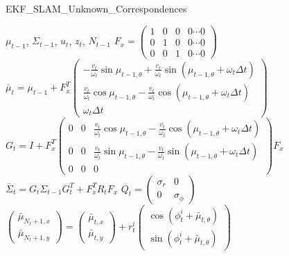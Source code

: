 \documentclass[conference]{IEEEtran}
\begin{document}
\begin{algorithm}[htbp]
	\caption{EKF\_SLAM\_Unknown\_Correspondences}
	\label{alg:EKF_SLAM_Unknown_Correspondences}
	\scriptsize
	\begin{algorithmic}[1]
		\Require $\mu_{t-1}$, $\Sigma_{t-1}$, $u_{t}$, $z_{t}$, $N_{t-1}$
		\State $F_{x} = \begin{pmatrix} 1 & 0 & 0 & 0 \cdots 0 \\ 0 & 1 & 0 & 0 \cdots 0 \\ 0 & 0 & 1 & 0 \cdots 0 \end{pmatrix}$
		\State $\bar{\mu}_{t} = \mu_{t-1} + F_{x}^{T} \begin{pmatrix} -\frac{v_{t}}{\omega_{t}}\sin{\mu_{t-1,\theta}} + \frac{v_{t}}{\omega_{t}}\sin(\mu_{t-1,\theta}+\omega_{t}\Delta{t}) \\ \frac{v_{t}}{\omega_{t}}\cos{\mu_{t-1,\theta}} - \frac{v_{t}}{\omega_{t}}\cos(\mu_{t-1,\theta}+\omega_{t}\Delta{t}) \\ \omega_{t}\Delta{t} \end{pmatrix}$
		\State $G_{t} = I + F_{x}^{T} \begin{pmatrix} 0 & 0 & \frac{v_{t}}{\omega_{t}}\cos{\mu_{t-1,\theta}} - \frac{v_{t}}{\omega_{t}}\cos(\mu_{t-1,\theta}+\omega_{t}\Delta{t}) \\ 0 & 0 & \frac{v_{t}}{\omega_{t}}\sin{\mu_{t-1,\theta}} - \frac{v_{t}}{\omega_{t}}\sin(\mu_{t-1,\theta}+\omega_{t}\Delta{t}) \\ 0 & 0 & 0 \end{pmatrix} F_{x}$
		\State $\bar{\Sigma}_{t} = G_{t}\Sigma_{t-1}G_{t}^{T} + F_{x}^{T}R_{t}F_{x}$
		\State $Q_{t} = \begin{pmatrix} \sigma_{r} & 0 \\ 0 & \sigma_{\phi} \end{pmatrix}$
			\State $\begin{pmatrix} \bar{\mu}_{N_{t}+1,x} \\ \bar{\mu}_{N_{t}+1,y} \end{pmatrix} = \begin{pmatrix} \bar{\mu}_{t,x} \\ \bar{\mu}_{t,y} \end{pmatrix} + r_{t}^{i} \begin{pmatrix} \cos(\phi_{t}^{i}+\bar{\mu}_{t,\theta}) \\ \sin(\phi_{t}^{i}+\bar{\mu}_{t,\theta}) \end{pmatrix}	$

\end{algorithmic}
\end{algorithm}
\end{document}
